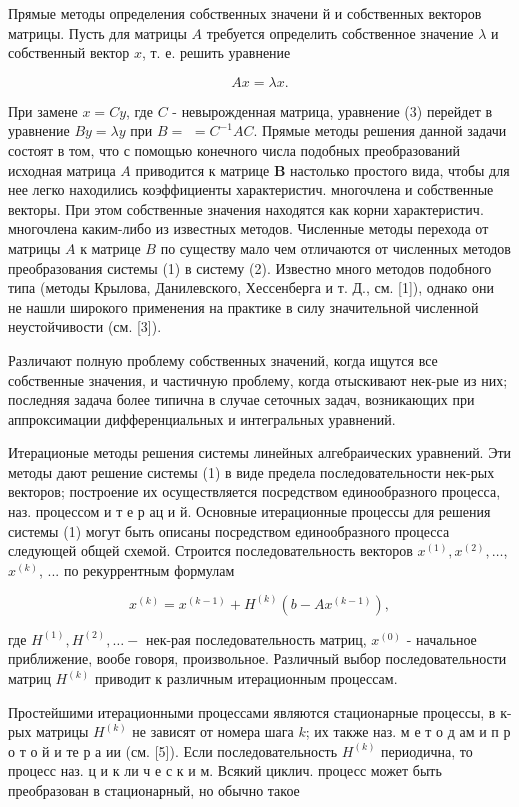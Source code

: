 \documentclass[10pt]{article}
\begin{document}
Прямые методы определения собственных значени й и собственных векторов матрицы. Пусть для матрицы $A$ требуется определить собственное значение $\lambda$ и собственный вектор $x$, т. е. решить уравнение



\[

A x=\lambda x .

\]



При замене $x=C y$, где $C$ - невырожденная матрица, уравнение (3) перейдет в уравнение $B y=\lambda y$ при $B=$ $=C^{-1} A C$. Прямые методы решения данной задачи состоят в том, что с помощью конечного числа подобных преобразований исходная матрица $A$ приводится к матрице $\boldsymbol{B}$ настолько простого вида, чтобы для нее легко находились коэффициенты характеристич. многочлена и собственные векторы. При этом собственные значения находятся как корни характеристич. многочлена каким-либо из известных методов. Численные методы перехода от матрицы $A$ к матрице $B$ по существу мало чем отличаются от численных методов преобразования системы (1) в систему (2). Известно много методов подобного типа (методы Крылова, Данилевского, Хессенберга и т. Д., см. [1]), однако они не нашли широкого применения на практике в силу значительной численной неустойчивости (см. [3]).



Различают полную проблему собственных значений, когда ищутся все собственные значения, и частичную проблему, когда отыскивают нек-рые из них; последняя задача более типична в случае сеточных задач, возникающих при аппроксимации дифференциальных и интегральных уравнений.



Итерационые методы решения системы линейных алгебраических уравнений. Эти методы дают решение системы (1) в виде предела последовательности нек-рых векторов; построение их осуществляется посредством единообразного процесса, наз. процессом и т е р ац и й. Основные итерационные процессы для решения системы (1) могут быть описаны посредством единообразного процесса следующей общей схемой. Строится последовательность векторов $x^{(1)}, x^{(2)}, \ldots$, $x^{(k)}$, ... по рекуррентным формулам



\[

x^{(k)}=x^{(k-1)}+H^{(k)}\left(b-A x^{(k-1)}\right),

\]



где $H^{(1)}, H^{(2)}, \ldots-$ нек-рая последовательность матриц, $x^{(0)}$ - начальное приближение, вообе говоря, произвольное. Различный выбор последовательности матриц $H^{(k)}$ приводит к различным итерационным процессам.



Простейшими итерационными процессами являются стационарные процессы, в к-рых матрицы $H^{(k)}$ не зависят от номера шага $k$; их также наз. м е т о д ам и п р о т о й и те р а ии (см. [5]). Если последовательность $H^{(k)}$ периодична, то процесс наз. ц и к ли ч е с к и м. Всякий циклич. процесс может быть преобразован в стационарный, но обычно такое
\end{document}
